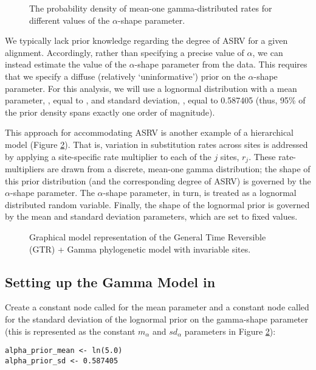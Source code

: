 \begin{figure}[h]
\centering
{}
\caption{\small The probability density of mean-one gamma-distributed rates for different values of the $\alpha$-shape parameter.}
\label{asrhGammaFig}
\end{figure}

We typically lack prior knowledge regarding the degree of ASRV for a given alignment.
Accordingly, rather than specifying a precise value of $\alpha$, we can instead estimate the value of the $\alpha$-shape parameter from the data.
This requires that we specify a diffuse (relatively `uninformative') prior on the $\alpha$-shape parameter.
For this analysis, we will use a lognormal distribution with a mean parameter, , equal to , and standard deviation, , equal to 0.587405 (thus, 95\% of the prior density spans exactly one order of magnitude).

This approach for accommodating ASRV is another example of a hierarchical model (Figure \ref{fig:gtrg}).
That is, variation in substitution rates across sites is addressed by applying a site-specific rate multiplier to each of the $j$ sites, $r_j$.
These rate-multipliers are drawn from a discrete, mean-one gamma distribution; the shape of this prior distribution (and the corresponding degree of ASRV) is governed by the $\alpha$-shape parameter.
The $\alpha$-shape parameter, in turn, is treated as a lognormal distributed random variable.
Finally, the shape of the lognormal prior is governed by the mean and standard deviation parameters, which are set to fixed values.   

\begin{figure}[h!]
\centering
{}
\caption{\small Graphical model representation of the General Time Reversible (GTR) + Gamma phylogenetic model with invariable sites.}
\label{fig:gtrg}
\end{figure}

\subsection{Setting up the Gamma Model in \RevBayes}

Create a constant node called  for the mean parameter and a constant node called  for the standard deviation of the lognormal prior on the gamma-shape parameter (this is represented as the constant $m_\alpha$ and $sd_\alpha$ parameters in Figure \ref{fig:gtrg}):
{\tt\begin{snugshade*}
\begin{lstlisting}
alpha_prior_mean <- ln(5.0)
alpha_prior_sd <- 0.587405
\end{lstlisting}
\end{snugshade*}}

